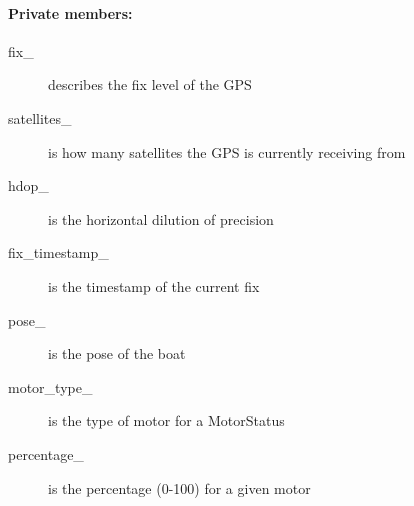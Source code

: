 \paragraph{Private members:}
\begin{adjustwidth}{2.5em}{0pt}\begin{description}
		\item [fix_] describes the fix level of the GPS
		\item [satellites_] is how many satellites the GPS is currently receiving from
		\item [hdop_] is the horizontal dilution of precision
		\item [fix_timestamp_] is the timestamp of the current fix 
		\item [pose_] is the pose of the boat
		\item [motor_type_] is the type of motor for a MotorStatus
		\item [percentage_] is the percentage (0-100) for a given motor
\end{description}\end{adjustwidth}